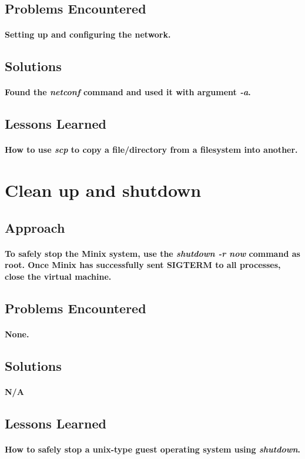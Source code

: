 \documentclass[12pt, oneside, a4paper]{article}
\begin{document}
	\subsection*{Problems Encountered}
		\paragraph{
			Setting up and configuring the network.
		}
	\subsection*{Solutions}
		\paragraph{
			Found the \emph{netconf} command and used it with argument \emph{-a}.
		}
	\subsection*{Lessons Learned}
		\paragraph{
			How to use \emph{scp} to copy a file/directory from a filesystem into
			another.
		}
\newpage

\section{Clean up and shutdown}
	\subsection*{Approach}
		\paragraph{
			To safely stop the Minix system, use the \emph{shutdown -r now}
			command as root.  Once Minix has successfully sent SIGTERM to all processes,
			close the virtual machine.
		}
	\subsection*{Problems Encountered}
		\paragraph{
			None.
		}
	\subsection*{Solutions}
		\paragraph{
			N/A
		}
	\subsection*{Lessons Learned}
		\paragraph{
			How to safely stop a unix-type guest operating system using \emph{shutdown}.
		}
\newpage
\end{document}
